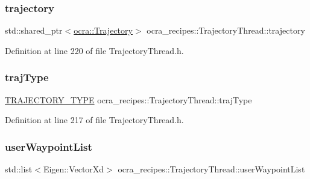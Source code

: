 \subsubsection{\texorpdfstring{trajectory}{trajectory}}
{\footnotesize\ttfamily std\+::shared\+\_\+ptr$<$\hyperlink{classocra_1_1Trajectory}{ocra\+::\+Trajectory}$>$ ocra\+\_\+recipes\+::\+Trajectory\+Thread\+::trajectory\hspace{0.3cm}{\ttfamily [protected]}}



Definition at line 220 of file Trajectory\+Thread.\+h.

\hypertarget{classocra__recipes_1_1TrajectoryThread_a1ed2999782ff98b02b5d99ac66766cd7}{}\label{classocra__recipes_1_1TrajectoryThread_a1ed2999782ff98b02b5d99ac66766cd7} 
\subsubsection{\texorpdfstring{traj\+Type}{trajType}}
{\footnotesize\ttfamily \hyperlink{namespaceocra__recipes_a729e1c8304e390d16219eda5f9756152}{T\+R\+A\+J\+E\+C\+T\+O\+R\+Y\+\_\+\+T\+Y\+PE} ocra\+\_\+recipes\+::\+Trajectory\+Thread\+::traj\+Type\hspace{0.3cm}{\ttfamily [protected]}}



Definition at line 217 of file Trajectory\+Thread.\+h.

\hypertarget{classocra__recipes_1_1TrajectoryThread_ab0d6ab656c8e4c7abd3bae0343b51562}{}\label{classocra__recipes_1_1TrajectoryThread_ab0d6ab656c8e4c7abd3bae0343b51562} 
\subsubsection{\texorpdfstring{user\+Waypoint\+List}{userWaypointList}}
{\footnotesize\ttfamily std\+::list$<$Eigen\+::\+Vector\+Xd$>$ ocra\+\_\+recipes\+::\+Trajectory\+Thread\+::user\+Waypoint\+List\hspace{0.3cm}{\ttfamily [protected]}}



